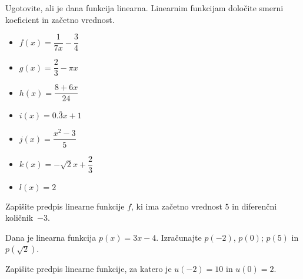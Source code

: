        
            \begin{naloga}
                Ugotovite, ali je dana funkcija linearna. Linearnim funkcijam določite smerni koeficient in začetno vrednost.
                \begin{multicols}{2}
                \begin{itemize}
                        \item $f(x)=\dfrac{1}{7x}-\dfrac{3}{4}$ 
                        \item $g(x)=\dfrac{2}{3}-\pi x$ 
                        \item $h(x)=\dfrac{8+6x}{24}$ 
                        \item $i(x)=0.\overline{3}x+1$ 
                        \item $j(x)=\dfrac{x^2-3}{5}$ 
                        \item $k(x)=-\sqrt{2}x+\dfrac{2}{3}$ 
                        \item $l(x)=2$ 
                    \end{itemize}
                \end{multicols}
            \end{naloga}
        



        
            \begin{naloga}
                Zapišite predpis linearne funkcije $f$, ki ima začetno vrednost $5$ in diferenčni količnik~$-3$. 
            \end{naloga}

            \begin{naloga}
                Dana je linearna funkcija $p(x)=3x-4$. Izračunajte $p(-2)$, $p(0)$; $p(5)$ in $p(\sqrt{2})$. 
            \end{naloga}

            \begin{naloga}
                Zapišite predpis linearne funkcije, za katero je $u(-2)=10$ in $u(0)=2$. 
            \end{naloga}

        


